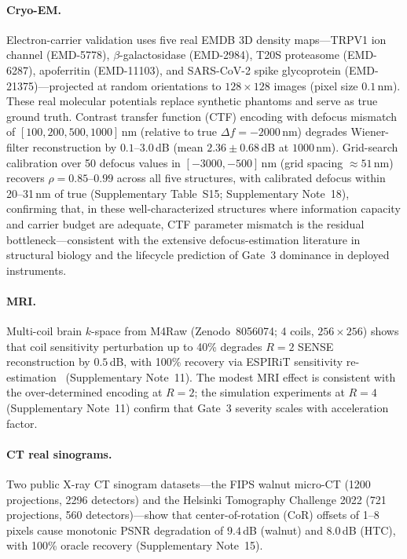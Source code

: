 \documentclass[11pt]{article}
\newcommand{\recoveryratio}{\rho}
\begin{document}
\paragraph{Cryo-EM.}
Electron-carrier validation uses five real EMDB 3D density maps---TRPV1 ion channel (EMD-5778), $\beta$-galactosidase (EMD-2984), T20S proteasome (EMD-6287), apoferritin (EMD-11103), and SARS-CoV-2 spike glycoprotein (EMD-21375)---projected at random orientations to $128 \times 128$ images (pixel size $0.1$\,nm). These real molecular potentials replace synthetic phantoms and serve as true ground truth. Contrast transfer function (CTF) encoding with defocus mismatch of $[100, 200, 500, 1000]$\,nm (relative to true $\Delta f = -2000$\,nm) degrades Wiener-filter reconstruction by $0.1$--$3.0$\,dB (mean $2.36 \pm 0.68$\,dB at $1000$\,nm). Grid-search calibration over 50 defocus values in $[-3000, -500]$\,nm (grid spacing ${\approx}51$\,nm) recovers $\recoveryratio = 0.85$--$0.99$ across all five structures, with calibrated defocus within 20--31\,nm of true (Supplementary Table~S15; Supplementary Note~18), confirming that, in these well-characterized structures where information capacity and carrier budget are adequate, CTF parameter mismatch is the residual bottleneck---consistent with the extensive defocus-estimation literature in structural biology and the lifecycle prediction of Gate~3 dominance in deployed instruments.

\paragraph{MRI.}
Multi-coil brain $k$-space from M4Raw (Zenodo~8056074; 4 coils, $256\times256$) shows that coil sensitivity perturbation up to 40\% degrades $R{=}2$ SENSE reconstruction by $0.5$\,dB, with 100\% recovery via ESPIRiT sensitivity re-estimation~\cite{uecker2014espirit} (Supplementary Note~11). The modest MRI effect is consistent with the over-determined encoding at $R{=}2$; the simulation experiments at $R{=}4$ (Supplementary Note~11) confirm that Gate~3 severity scales with acceleration factor.

\paragraph{CT real sinograms.}
Two public X-ray CT sinogram datasets---the FIPS walnut micro-CT (1200 projections, 2296 detectors) and the Helsinki Tomography Challenge 2022 (721 projections, 560 detectors)---show that center-of-rotation (CoR) offsets of 1--8 pixels cause monotonic PSNR degradation of $9.4$\,dB (walnut) and $8.0$\,dB (HTC), with 100\% oracle recovery (Supplementary Note~15).
\end{document}
